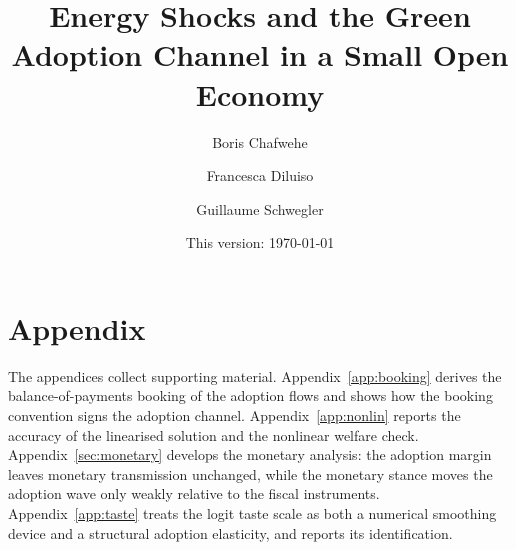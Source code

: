 \documentclass[12pt]{article}
\title{Energy Shocks and the Green Adoption Channel in a Small Open Economy}
\author{Boris Chafwehe \and Francesca Diluiso \and Guillaume Schwegler}
\date{\normalsize This version: \today}
\begin{document}











\clearpage



\clearpage
\appendix
\section*{Appendix}

\noindent The appendices collect supporting material. Appendix~\ref{app:booking}
derives the balance-of-payments booking of the adoption flows and shows how the
booking convention signs the adoption channel. Appendix~\ref{app:nonlin} reports
the accuracy of the linearised solution and the nonlinear welfare check. Appendix~\ref{sec:monetary}
develops the monetary analysis: the adoption margin leaves monetary transmission
unchanged, while the monetary stance moves the adoption wave only weakly relative to
the fiscal instruments. Appendix~\ref{app:taste} treats the logit taste scale as both
a numerical smoothing device and a structural adoption elasticity, and reports its
identification.






\end{document}
